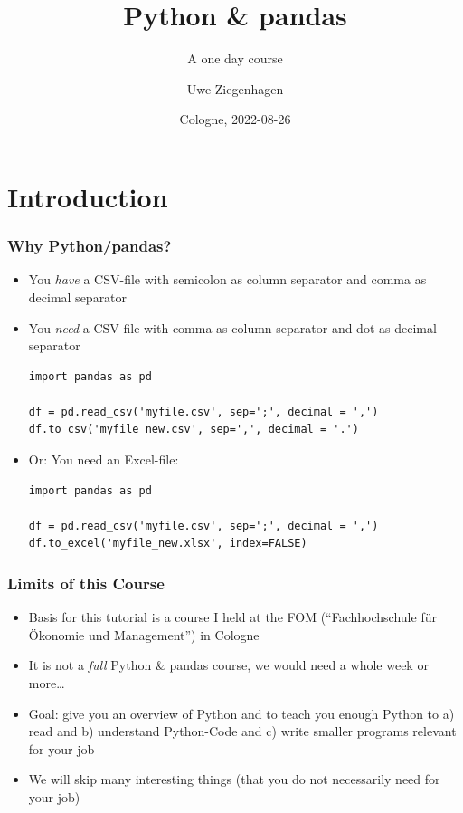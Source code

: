 \documentclass[ngerman]{beamer}
\author{Uwe Ziegenhagen}
\title{Python \& pandas}
\subtitle{A one day course}
\institute{\url{github.com/UweZiegenhagen/OneDayPythonPandasCourse}}
\date{Cologne, 2022-08-26}
\begin{document}
\begin{frame}

\maketitle

\end{frame}

\section{Introduction}

\begin{frame}[fragile]
\frametitle{Why Python/pandas?}

\begin{itemize}
	\item You \textit{have} a CSV-file with semicolon as column separator and comma as decimal separator
	\item You \textit{need} a CSV-file with comma as column separator and dot as decimal separator


\begin{lstlisting}
import pandas as pd

df = pd.read_csv('myfile.csv', sep=';', decimal = ',')
df.to_csv('myfile_new.csv', sep=',', decimal = '.')
\end{lstlisting}

	\item Or: You need an Excel-file:


\begin{lstlisting}
import pandas as pd

df = pd.read_csv('myfile.csv', sep=';', decimal = ',')
df.to_excel('myfile_new.xlsx', index=FALSE)
\end{lstlisting}

\end{itemize}

\end{frame}

\begin{frame}
\frametitle{Limits of this Course}

\begin{itemize}
\item Basis for this tutorial is a course I held at the FOM (\enquote{Fachhochschule für Ökonomie und Management}) in Cologne 
\item It is not a \textit{full} Python \& pandas course, we would need a whole week or more\ldots
\item Goal: give you an overview of Python and to teach you enough Python to a) read and b) understand Python-Code and c) write smaller programs relevant for your job 
\item We will skip many interesting things (that you do not necessarily need for your job)
\end{itemize}
\end{frame}
\end{document}
